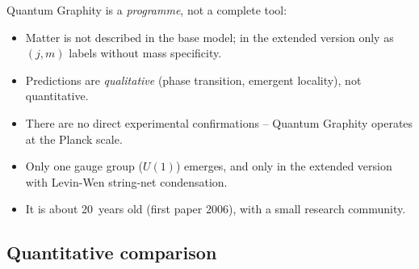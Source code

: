 Quantum Graphity is a \emph{programme}, not a complete tool:
\begin{itemize}[leftmargin=2em,itemsep=2pt,topsep=2pt]
  \item Matter is not described in the base model; in the extended
        version only as $(j, m)$ labels without mass specificity.
  \item Predictions are \emph{qualitative} (phase transition,
        emergent locality), not quantitative.
  \item There are no direct experimental confirmations -- Quantum
        Graphity operates at the Planck scale.
  \item Only one gauge group ($U(1)$) emerges, and only in the
        extended version with Levin-Wen string-net condensation.
  \item It is about 20~years old (first paper 2006), with a small research
        community.
\end{itemize}

\subsection{Quantitative comparison}

\begin{center}
\renewcommand{\arraystretch}{1.4}
{\small
{}
}
\renewcommand{\arraystretch}{1.0}
\end{center}

